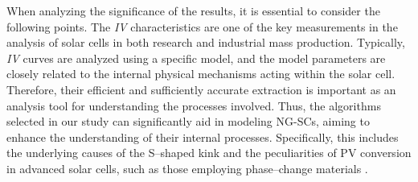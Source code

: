 \documentclass[a4paper,fleqn]{cas-sc}
\begin{document}
When analyzing the significance of the results, it is essential to consider the following points.
The \emph{IV} characteristics are one of the key measurements  in the analysis
of solar cells in both research and industrial mass production.
Typically, \emph{IV} curves are analyzed using a specific model,
and the model parameters are closely related to the internal physical mechanisms acting within the solar cell.
Therefore, their efficient and sufficiently accurate extraction is important
as an analysis tool for understanding the processes involved.
Thus, the algorithms selected in our study can significantly aid in modeling NG-SCs,
aiming to enhance the understanding of their internal processes.
Specifically, this includes the underlying causes of the S--shaped kink
and the peculiarities of PV conversion in advanced solar cells, such as those employing phase--change materials \cite{Zhu2024,Zhu2023}.
\end{document}
